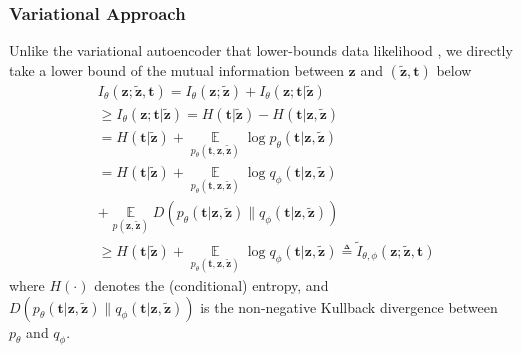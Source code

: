 \documentclass[10pt,journal,compsoc,twoside]{IEEEtran}
\begin{document}
\subsubsection{Variational Approach}

Unlike the variational autoencoder that lower-bounds data likelihood \cite{kingma2013auto}, we directly take a lower bound of the mutual information \cite{agakov2004algorithm} between  $\mathbf z$ and $(\mathbf {\tilde z},\mathbf t)$ below
\[
\begin{aligned}
&I_\theta(\mathbf z; \mathbf {\tilde z},\mathbf t) = I_\theta(\mathbf z; \mathbf {\tilde z}) + I_\theta(\mathbf z; \mathbf t|\mathbf {\tilde z})\\
&\geq I_\theta(\mathbf z; \mathbf t|\mathbf {\tilde z})
= H(\mathbf t|\mathbf {\tilde z}) - H(\mathbf t|\mathbf z,\mathbf {\tilde z})\\
&=H(\mathbf t|\mathbf {\tilde z}) +\mathop\mathbb E\limits_{p_\theta(\mathbf t,\mathbf z,\mathbf {\tilde z})} \log p_\theta(\mathbf t|\mathbf z,\mathbf {\tilde z})\\
&= H(\mathbf t|\mathbf {\tilde z})  + \mathop\mathbb E\limits_{p_\theta(\mathbf t,\mathbf z,\mathbf {\tilde z})} \log q_\phi(\mathbf t|\mathbf z,\mathbf {\tilde z})\\
&+ \mathop\mathbb E\limits_{p(\mathbf z,\mathbf {\tilde z})} D(p_\theta(\mathbf t|\mathbf z,\mathbf {\tilde z})\|q_\phi(\mathbf t|\mathbf z,\mathbf {\tilde z}))\\
&\geq H(\mathbf t|\mathbf {\tilde z})  + \mathop\mathbb E\limits_{p_\theta(\mathbf t,\mathbf z,\mathbf {\tilde z})} \log q_\phi(\mathbf t|\mathbf z,\mathbf {\tilde z}) \triangleq \tilde I_{\theta,\phi}(\mathbf z;\mathbf {\tilde z},\mathbf t)
\end{aligned}
\]
where $H(\cdot)$ denotes the (conditional) entropy, and $D(p_\theta(\mathbf t|\mathbf z,\mathbf {\tilde z})\|q_\phi(\mathbf t|\mathbf z,\mathbf {\tilde z}))$ is the non-negative Kullback divergence between $p_\theta$ and $q_\phi$.
\end{document}
